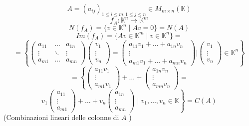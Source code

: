 \documentclass[a4paper]{article}
\theoremstyle{break}
\theoremstyle{break}
\theoremstyle{break}
\theoremstyle{break}
\begin{document}
\begin{example}
  \[
    A = (a_{ij})_{1 \le i \le m, 1 \le j \le n} \in M_{m \times n}(\mathbb{K})
  \] 
  \[
  f_A: \mathbb{K}^n \to \mathbb{K}^m
  \] 
  \[
  N(f_A) = \{v \in \mathbb{K}^n \;|\; Av = 0\} = N(A)
  \] 
  \[
  Im(f_A) = \{Av \in \mathbb{K}^m \;|\; v \in \mathbb{K}^n\} =
  \] 
  \[
  = \left\{ \begin{pmatrix} 
      a_{11} & \ldots & a_{1n}\\
      \vdots & \ddots & \vdots\\
      a_{m1} & \ldots & a_{mn}
  \end{pmatrix} \begin{pmatrix} 
  v_1 \\
  \vdots \\
  v_n
  \end{pmatrix} =
  \begin{pmatrix} 
    a_{11}v_1 + \ldots + a_{1n}v_n\\
    \vdots\\
    a_{m1}v_1 + \ldots + a_{mn}v_n
  \end{pmatrix} 
  |
  \begin{pmatrix} 
    v_1\\
    \vdots\\
    v_n
  \end{pmatrix} 
  \in \mathbb{K}^n \right\}
  \] 
  \[
  = \left\{ \begin{pmatrix} 
      a_{11}v_1\\
      \vdots\\
      a_{m1}v_1
  \end{pmatrix}
  +
  \ldots
  +
  \begin{pmatrix} 
    a_{1n}v_n\\
    \vdots\\
    a_{mn}v_n
  \end{pmatrix}
  =
  \right.
\]
\[
  \left.
  v_1 \begin{pmatrix} 
    a_{11}\\
    \vdots\\
    a_{m1}
  \end{pmatrix}
  + 
  \ldots
  +
  v_n \begin{pmatrix} 
    a_{1n}\\
    \vdots\\
    a_{mn}
  \end{pmatrix}
  \; \Big | \;
  v_1, \ldots, v_n \in \mathbb{K} \right\} = C(A)
  \] 
  (Combinazioni lineari delle colonne di \( A \) )
\end{example}
\end{document}
